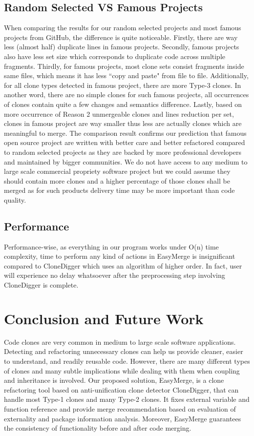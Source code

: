 \documentclass{acm_proc_article-sp}
\begin{document}
\subsection{Random Selected VS Famous Projects}
When comparing the results for our random selected projects and most famous projects from GitHub, the difference is quite noticeable.
Firstly, there are way less (almost half) duplicate lines in famous projects. Secondly, famous projects also have less set size which corresponds to
duplicate code across multiple fragments. Thirdly, for famous projects, most clone sets consist fragments inside same files, which means it has less 
``copy and paste" from file to file. Additionally, for all clone types detected in famous project, there are more Type-3 clones. In another word,
there are no simple clones for such famous projects, all occurrences of clones contain quite a few changes and semantics difference.
Lastly, based on more occurrence of Reason 2 unmergeable clones and lines reduction per set, clones in famous project are way smaller thus
less are actually clones which are meaningful to merge. The comparison result confirms our prediction that famous open source project are written
with better care and better refactored compared to random selected projects as they are backed by more professional developers and maintained by
bigger communities. We do not have access to any medium to large scale commercial propriety software project but we could assume they should
contain more clones and a higher percentage of those clones shall be merged as for such products delivery time may be more important than
code quality.

\subsection{Performance}
Performance-wise, as everything in our program works under O(n) time complexity, time to perform any kind of actions in EasyMerge is insignificant 
compared to CloneDigger which uses an algorithm of higher order. In fact, user will experience no delay whatsoever after the preprocessing step involving
CloneDigger is complete.


\section{Conclusion and Future Work}
Code clones are very common in medium to large scale software applications.
Detecting and refactoring unnecessary clones can help us provide cleaner, easier to understand, and readily reusable code.
However, there are many different types of clones and many subtle implications while dealing with them when coupling and
inheritance is involved. Our proposed solution, EasyMerge, is a clone refactoring tool based on anti-unification clone detector 
CloneDigger, that can handle most Type-1 clones and many Type-2 clones. It fixes external variable and function reference
and provide merge recommendation based on evaluation of externality and package information analysis.
Moreover, EasyMerge guarantees the consistency of functionality before and after code merging.
\end{document}
